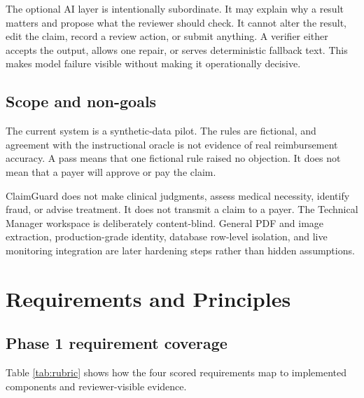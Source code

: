 \documentclass[11pt,a4paper,oneside]{report}
\begin{document}
The optional AI layer is intentionally subordinate. It may explain why a result matters and propose what the reviewer should check. It cannot alter the result, edit the claim, record a review action, or submit anything. A verifier either accepts the output, allows one repair, or serves deterministic fallback text. This makes model failure visible without making it operationally decisive.

\section{Scope and non-goals}
The current system is a synthetic-data pilot. The rules are fictional, and agreement with the instructional oracle is not evidence of real reimbursement accuracy. A pass means that one fictional rule raised no objection. It does not mean that a payer will approve or pay the claim.

ClaimGuard does not make clinical judgments, assess medical necessity, identify fraud, or advise treatment. It does not transmit a claim to a payer. The Technical Manager workspace is deliberately content-blind. General PDF and image extraction, production-grade identity, database row-level isolation, and live monitoring integration are later hardening steps rather than hidden assumptions.

\chapter{Requirements and Principles}

\section{Phase 1 requirement coverage}
Table \ref{tab:rubric} shows how the four scored requirements map to implemented components and reviewer-visible evidence.
\end{document}
